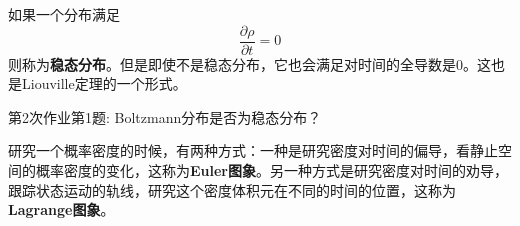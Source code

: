     如果一个分布满足
    \begin{equation*}
        \frac {\partial \rho}{\partial t} = 0
    \end{equation*}
    则称为\textbf{稳态分布}。但是即使不是稳态分布，它也会满足对时间的全导数是0。这也是Liouville定理的一个形式。
    \begin{asg}
        第2次作业第1题: Boltzmann分布是否为稳态分布？
    \end{asg}

    研究一个概率密度的时候，有两种方式：一种是研究密度对时间的偏导，看静止空间的概率密度的变化，这称为\textbf{Euler图象}。另一种方式是研究密度对时间的劝导，跟踪状态运动的轨线，研究这个密度体积元在不同的时间的位置，这称为\textbf{Lagrange图象}。

    
    
